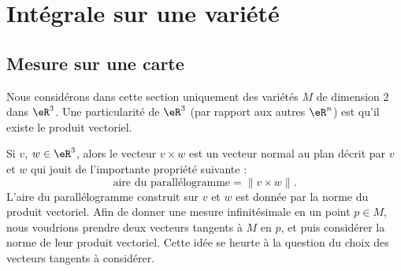 \section{Intégrale sur une variété}

\subsection{Mesure sur une carte}

Nous considérons dans cette section uniquement des variétés \( M\) de dimension \( 2\) dans \( \eR^3\).  Une particularité de \( \eR^3\) (par rapport aux autres \( \eR^n\)) est qu'il existe le produit vectoriel.

Si \( v\), \( w\in\eR^3\), alors le vecteur \( v\times w\) est un vecteur normal au plan décrit par \( v\) et \( w\) qui jouit de l'importante propriété suivante :
\begin{equation}
	\text{aire du parallélogramme}=\| v\times w \|.
\end{equation}
L'aire du parallélogramme construit sur \( v\) et \( w\) est donnée par la norme du produit vectoriel. Afin de donner une mesure infinitésimale en un point \( p\in M\), nous voudrions prendre deux vecteurs tangents à \( M\) en \( p\), et puis considérer la norme de leur produit vectoriel. Cette idée se heurte à la question du choix des vecteurs tangents à considérer.

